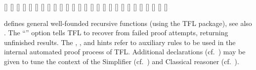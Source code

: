 \begin{isabellebody}
\begin{isamarkuptext}
  \begin{railoutput}
[]
\rail@bar
{}
[]
[]
[]
\rail@endbar
{}
[]
[]
\rail@plus
{}[]
\rail@endplus
\rail@bar
{}
[]
\rail@endbar
\rail@end
{}
[]
\rail@bar
{}
[]
\rail@endbar
{}[]
\rail@end
{}
[]
[]
\rail@plus
{}
[]
\rail@endplus
{}[]
\rail@end
{}
\rail@bar
\rail@bar
{}[]
[]
[]
\rail@endbar
\rail@bar
{}
[]
[]
\rail@endbar
{}[]
[]
[]
\rail@endbar
\rail@end
{}
[]
\rail@bar
{}
[]
[]
[]
\rail@endbar
\rail@end
\end{railoutput}


  \begin{description}

  \item \hyperlink{command.HOL.recdef}{\mbox{}} defines general well-founded
  recursive functions (using the TFL package), see also
  \cite{isabelle-HOL}.  The ``'' option tells
  TFL to recover from failed proof attempts, returning unfinished
  results.  The , , and  hints refer to auxiliary rules to be used in the internal
  automated proof process of TFL.  Additional \hyperlink{syntax.clasimpmod}{\mbox{}}
  declarations (cf.\ ) may be given to tune the
  context of the Simplifier (cf.\ ) and
  Classical reasoner (cf.\ ).


\end{description}
\end{isamarkuptext}
\end{isabellebody}
